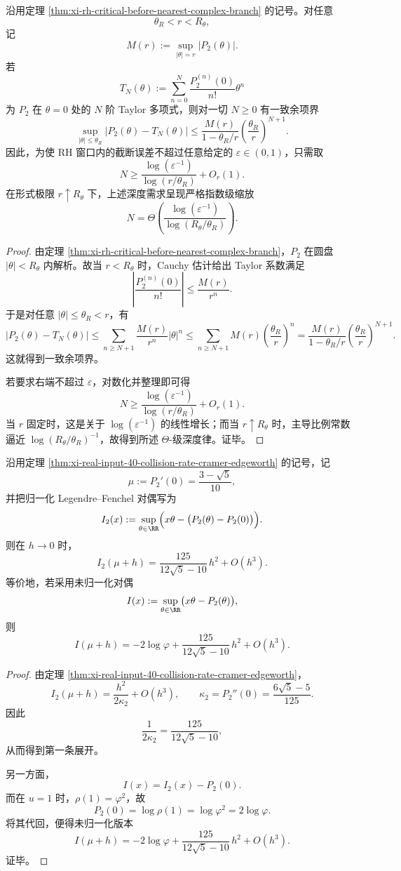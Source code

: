 \begin{theorem}\label{thm:xi-time-part65-collision-taylor-depth-exp-bound}
沿用定理 \ref{thm:xi-rh-critical-before-nearest-complex-branch} 的记号。对任意
\[
\theta_R<r<R_\theta,
\]
记
\[
M(r):=\sup_{|\theta|=r}|P_2(\theta)|.
\]
若
\[
T_N(\theta):=\sum_{n=0}^N\frac{P_2^{(n)}(0)}{n!}\theta^n
\]
为 \(P_2\) 在 \(\theta=0\) 处的 \(N\) 阶 Taylor 多项式，则对一切 \(N\ge 0\) 有一致余项界
\[
\sup_{|\theta|\le \theta_R}|P_2(\theta)-T_N(\theta)|
\le
\frac{M(r)}{1-\theta_R/r}\left(\frac{\theta_R}{r}\right)^{N+1}.
\]
因此，为使 RH 窗口内的截断误差不超过任意给定的 \(\varepsilon\in(0,1)\)，只需取
\[
N\ge
\frac{\log(\varepsilon^{-1})}{\log(r/\theta_R)}+O_r(1).
\]
在形式极限 \(r\uparrow R_\theta\) 下，上述深度需求呈现严格指数级缩放
\[
N=
\Theta\!\left(
\frac{\log(\varepsilon^{-1})}{\log(R_\theta/\theta_R)}
\right).
\]
\end{theorem}
\begin{proof}
由定理 \ref{thm:xi-rh-critical-before-nearest-complex-branch}，\(P_2\) 在圆盘 \(|\theta|<R_\theta\) 内解析。故当 \(r<R_\theta\) 时，Cauchy 估计给出 Taylor 系数满足
\[
\left|\frac{P_2^{(n)}(0)}{n!}\right|
\le
\frac{M(r)}{r^n}.
\]
于是对任意 \(|\theta|\le \theta_R<r\)，有
\[
|P_2(\theta)-T_N(\theta)|
\le
\sum_{n\ge N+1}\frac{M(r)}{r^n}|\theta|^n
\le
\sum_{n\ge N+1}M(r)\left(\frac{\theta_R}{r}\right)^n
=
\frac{M(r)}{1-\theta_R/r}\left(\frac{\theta_R}{r}\right)^{N+1}.
\]
这就得到一致余项界。

若要求右端不超过 \(\varepsilon\)，对数化并整理即可得
\[
N\ge
\frac{\log(\varepsilon^{-1})}{\log(r/\theta_R)}+O_r(1).
\]
当 \(r\) 固定时，这是关于 \(\log(\varepsilon^{-1})\) 的线性增长；而当 \(r\uparrow R_\theta\) 时，主导比例常数逼近 \(\log(R_\theta/\theta_R)^{-1}\)，故得到所述 \(\Theta\)-级深度律。证毕。
\end{proof}

\begin{theorem}[碰撞位势大偏差率函数在均值点的显式二次胚]\label{thm:xi-time-part65-collision-rate-quadratic-germ}
沿用定理 \ref{thm:xi-real-input-40-collision-rate-cramer-edgeworth} 的记号，记
\[
\mu:=P_2'(0)=\frac{3-\sqrt5}{10},
\]
并把归一化 Legendre--Fenchel 对偶写为
\[
I_2(x):=\sup_{\theta\in\RR}\Bigl(x\theta-\bigl(P_2(\theta)-P_2(0)\bigr)\Bigr).
\]
则在 \(h\to 0\) 时，
\[
\boxed{\;
I_2(\mu+h)
=
\frac{125}{12\sqrt5-10}\,h^2+O(h^3).\;}
\]
等价地，若采用未归一化对偶
\[
I(x):=\sup_{\theta\in\RR}\bigl(x\theta-P_2(\theta)\bigr),
\]
则
\[
\boxed{\;
I(\mu+h)
=
-2\log\varphi
+\frac{125}{12\sqrt5-10}\,h^2+O(h^3).\;}
\]
\end{theorem}
\begin{proof}
由定理 \ref{thm:xi-real-input-40-collision-rate-cramer-edgeworth}，
\[
I_2(\mu+h)
=
\frac{h^2}{2\kappa_2}+O(h^3),
\qquad
\kappa_2=P_2''(0)=\frac{6\sqrt5-5}{125}.
\]
因此
\[
\frac{1}{2\kappa_2}
=
\frac{125}{12\sqrt5-10},
\]
从而得到第一条展开。

另一方面，
\[
I(x)=I_2(x)-P_2(0).
\]
而在 \(u=1\) 时，\(\rho(1)=\varphi^2\)，故
\[
P_2(0)=\log \rho(1)=\log \varphi^2=2\log\varphi.
\]
将其代回，便得未归一化版本
\[
I(\mu+h)
=
-2\log\varphi+\frac{125}{12\sqrt5-10}\,h^2+O(h^3).
\]
证毕。
\end{proof}

